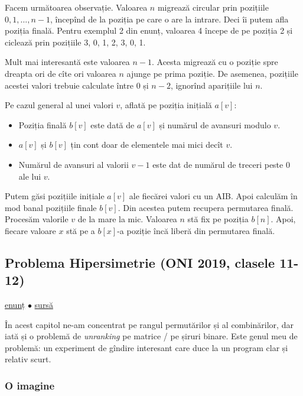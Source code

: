\documentclass[../main.tex]{subfiles}
\begin{document}
Facem următoarea observație. Valoarea $n$ migrează circular prin pozițiile $0, 1, \dots, n-1$, începînd de la poziția pe care o are la intrare. Deci îi putem afla poziția finală. Pentru exemplul 2 din enunț, valoarea 4 începe de pe poziția 2 și ciclează prin pozițiile 3, 0, 1, 2, 3, 0, 1.

Mult mai interesantă este valoarea $n-1$. Acesta migrează cu o poziție spre dreapta ori de cîte ori valoarea $n$ ajunge pe prima poziție. De asemenea, pozițiile acestei valori trebuie calculate între $0$ și $n-2$, ignorînd aparițiile lui $n$.

Pe cazul general al unei valori $v$, aflată pe poziția inițială $a[v]$:

\begin{itemize}
  \item Poziția finală $b[v]$ este dată de $a[v]$ și numărul de avansuri modulo $v$.

  \item $a[v]$ și $b[v]$ țin cont doar de elementele mai mici decît $v$.

  \item Numărul de avansuri al valorii $v-1$ este dat de numărul de treceri peste 0 ale lui $v$.
\end{itemize}

Putem găsi pozițiile inițiale $a[v]$ ale fiecărei valori cu un AIB. Apoi calculăm în mod banal pozițiile finale $b[v]$. Din acestea putem recupera permutarea finală. Procesăm valorile $v$ de la mare la mic. Valoarea $n$ stă fix pe poziția $b[n]$. Apoi, fiecare valoare $x$ stă pe a $b[x]$-a poziție încă liberă din permutarea finală.

\subsection{Problema Hipersimetrie (ONI 2019, clasele 11-12)}
\label{problem:hipersimetrie}

\href{https://kilonova.ro/problems/13}{enunț}
$\bullet$
\hyperref[code:hipersimetrie]{sursă}

În acest capitol ne-am concentrat pe rangul permutărilor și al combinărilor, dar iată și o problemă de \textit{unranking} pe matrice / pe șiruri binare. Este genul meu de problemă:   un experiment de gîndire interesant care duce la un program clar și relativ scurt.

\subsubsection*{O imagine}
\end{document}
